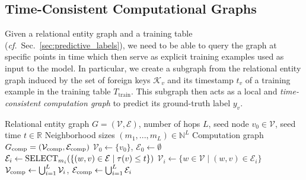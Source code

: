 \subsection{Time-Consistent Computational Graphs}
\label{sec:temporal_sampling}

Given a relational entity graph and a training table  (\emph{cf.}~Sec.~\ref{sec:predictive_labels}), we need to be able to query the graph at specific points in time which then serve as explicit training examples used as input to the model.
In particular, we create a subgraph from the relational entity graph induced by the set of foreign keys $\mathcal{K}_v$ and its timestamp $t_v$ of a training example in the training table $T_\text{train}$.
This subgraph then acts as a local and \emph{time-consistent computation graph} to predict its ground-truth label $y_v$.

\begin{algorithm}[t]
\caption{Time-Consistent Computation Graph}\label{alg:temp_sampling}
\begin{algorithmic}
\Require Relational entity graph $G = (\mathcal{V}, \mathcal{E})$, number of hops $L$, seed node $v_0\in\mathcal{V}$, seed time $t \in \mathbb{R}$
\Require Neighborhood sizes $(m_1,...,m_L) \in \mathbb{N}^L$
\Ensure Computation graph $G_{\rm comp} = (\mathcal{V}_{\rm comp}, \mathcal{E}_{\rm comp})$
\State $\mathcal V_0 \gets \{v_0\}$\textnormal{,} \quad $\mathcal E_0 \gets \emptyset $
    \State $\mathcal{E}_i \gets \textnormal{SELECT}_{m_i}(\{(w,v) \in \mathcal{E} \mid \tau(v)\leq t\})$ 
    \State $\mathcal{V}_i \gets \{w \in \mathcal{V} \mid (w,v) \in \mathcal{E}_i\}$  
\EndFor
\EndFor
\State $\mathcal V_{\rm comp} \gets \bigcup_{i=1}^L \mathcal V_i$\textnormal{,} \quad $\mathcal E_{\rm comp} \gets \bigcup_{i=1}^L \mathcal E_i$
\end{algorithmic}
\end{algorithm}

